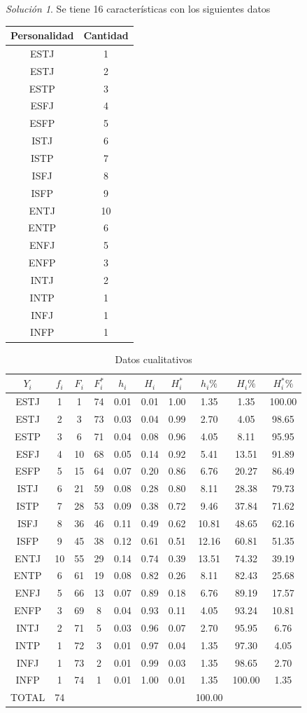 \documentclass[10pt,]{krantz}
\theoremstyle{definition}
\theoremstyle{definition}
\theoremstyle{definition}
\theoremstyle{definition}
\theoremstyle{remark}
\newtheorem*{solution}{Solución}
\begin{document}
\begin{solution}
{}
Se tiene 16 características con los siguientes datos

\begin{longtable}[]{@{}cc@{}}
\toprule
Personalidad & Cantidad\tabularnewline
\midrule
\endhead
ESTJ & 1\tabularnewline
ESTJ & 2\tabularnewline
ESTP & 3\tabularnewline
ESFJ & 4\tabularnewline
ESFP & 5\tabularnewline
ISTJ & 6\tabularnewline
ISTP & 7\tabularnewline
ISFJ & 8\tabularnewline
ISFP & 9\tabularnewline
ENTJ & 10\tabularnewline
ENTP & 6\tabularnewline
ENFJ & 5\tabularnewline
ENFP & 3\tabularnewline
INTJ & 2\tabularnewline
INTP & 1\tabularnewline
INFJ & 1\tabularnewline
INFP & 1\tabularnewline
\bottomrule
\end{longtable}
\end{solution}

\begin{longtable}[t]{cccccccccc}
\caption{\label{tab:cualitativa}Datos cualitativos}\\
\toprule
$Y_i$ & $f_i$ & $F_i$ & $F_i^*$ & $h_i$ & $H_i$ & $H_i^*$ & $h_i\%$ & $H_i\%$ & $H_i^*\%$\\
\midrule
ESTJ & 1 & 1 & 74 & 0.01 & 0.01 & 1.00 & 1.35 & 1.35 & 100.00\\
ESTJ & 2 & 3 & 73 & 0.03 & 0.04 & 0.99 & 2.70 & 4.05 & 98.65\\
ESTP & 3 & 6 & 71 & 0.04 & 0.08 & 0.96 & 4.05 & 8.11 & 95.95\\
ESFJ & 4 & 10 & 68 & 0.05 & 0.14 & 0.92 & 5.41 & 13.51 & 91.89\\
ESFP & 5 & 15 & 64 & 0.07 & 0.20 & 0.86 & 6.76 & 20.27 & 86.49\\
ISTJ & 6 & 21 & 59 & 0.08 & 0.28 & 0.80 & 8.11 & 28.38 & 79.73\\
ISTP & 7 & 28 & 53 & 0.09 & 0.38 & 0.72 & 9.46 & 37.84 & 71.62\\
ISFJ & 8 & 36 & 46 & 0.11 & 0.49 & 0.62 & 10.81 & 48.65 & 62.16\\
ISFP & 9 & 45 & 38 & 0.12 & 0.61 & 0.51 & 12.16 & 60.81 & 51.35\\
ENTJ & 10 & 55 & 29 & 0.14 & 0.74 & 0.39 & 13.51 & 74.32 & 39.19\\
ENTP & 6 & 61 & 19 & 0.08 & 0.82 & 0.26 & 8.11 & 82.43 & 25.68\\
ENFJ & 5 & 66 & 13 & 0.07 & 0.89 & 0.18 & 6.76 & 89.19 & 17.57\\
ENFP & 3 & 69 & 8 & 0.04 & 0.93 & 0.11 & 4.05 & 93.24 & 10.81\\
INTJ & 2 & 71 & 5 & 0.03 & 0.96 & 0.07 & 2.70 & 95.95 & 6.76\\
INTP & 1 & 72 & 3 & 0.01 & 0.97 & 0.04 & 1.35 & 97.30 & 4.05\\
INFJ & 1 & 73 & 2 & 0.01 & 0.99 & 0.03 & 1.35 & 98.65 & 2.70\\
INFP & 1 & 74 & 1 & 0.01 & 1.00 & 0.01 & 1.35 & 100.00 & 1.35\\
TOTAL & 74 &  &  &  &  &  & 100.00 &  & \\
\bottomrule
\end{longtable}
\end{document}
